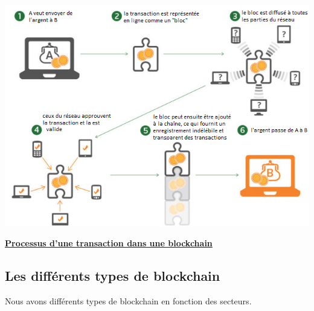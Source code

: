 \documentclass[12pt]{report}
\begin{document}
\begin{center}
    \includegraphics[width=1\textwidth]{blockchain-explained.png}

    \textbf{\underline{Processus d'une transaction dans une blockchain}} \\[1cm]
\end{center}


  \subsection{Les différents types de blockchain}
\hspace{1cm} Nous avons différents types de blockchain en fonction des secteurs. 
\end{document}
